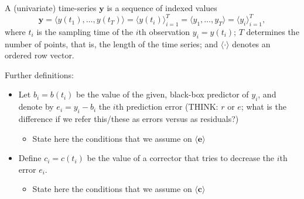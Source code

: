 \documentclass{article}
\begin{document}
A (univariate) time-series $\mathbf{y}$ is a sequence of indexed values
$$
\mathbf{y} = \langle y (t_1),\ldots ,y (t_T) \rangle = \langle y (t_i) \rangle_{i=1}^T  = \langle y_1,\ldots ,y_T \rangle = \langle y_i \rangle_{i=1}^T,
$$
where $t_i$ is the sampling time of the $i$th observation $y_i = y (t_i)$; $T$ determines the number of points, that is, the length of the time series; and $\langle \cdot \rangle$ denotes an ordered row vector.

Further definitions:
\begin{itemize}
\item Let $b_i = b (t_i)$ be the value of the given, black-box predictor of $y_i$, and denote by $e_i = y_i - b_i$ the $i$th prediction error (THINK: $r$ or $e$; what is the difference if we refer this/these as errors versus as residuals?)
\begin{itemize}
\item State here the conditions that we assume on $\langle \mathbf{e} \rangle$
\end{itemize}
\item Define $c_i = c (t_i)$ be the value of a corrector that tries to decrease the $i$th error $e_i$.
\begin{itemize}
\item State here the conditions that we assume on $\langle \mathbf{c} \rangle$
\end{itemize}

\end{itemize}
\end{document}
